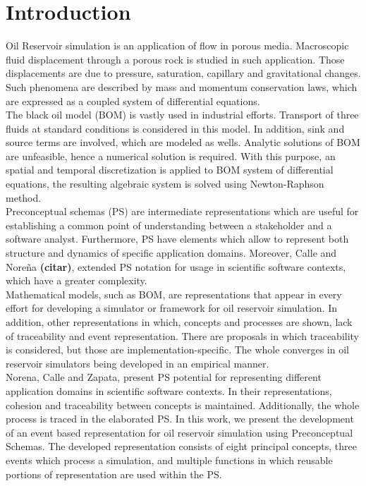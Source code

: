 \documentclass[review]{elsarticle}
\begin{document}
\linenumbers

\section{Introduction}
Oil Reservoir simulation is an application of flow in porous media. Macroscopic fluid displacement through a porous rock is studied in such application. Those displacements are due to pressure, saturation, capillary and gravitational changes. Such phenomena are described by mass and momentum conservation laws, which are expressed as a coupled system of differential equations.\\

The black oil model (BOM) is vastly used in industrial efforts. Transport of three fluids at standard conditions is considered in this model. In addition, sink and source terms are involved, which are modeled as wells. Analytic solutions of BOM are unfeasible, hence a numerical solution is required. With this purpose, an spatial and temporal discretization is applied to BOM system of differential equations, the resulting algebraic system is solved using Newton-Raphson method.\\

Preconceptual schemas (PS) are intermediate representations which are useful for establishing a common point of understanding between a stakeholder and a software analyst. Furthermore, PS have elements which allow to represent both structure and dynamics of specific application domains. Moreover, Calle and Nore\~na \textbf{{(citar)}}, extended PS notation for usage in scientific software contexts, which have a greater complexity.\\

Mathematical models, such as BOM, are representations that appear in every effort for developing a simulator or framework for oil reservoir simulation. In addition, other representations in which, concepts and processes are shown, lack of traceability and event representation. There are proposals in which traceability is considered, but those are implementation-specific. The whole converges in oil reservoir simulators being developed in an empirical manner.\\

Norena, Calle and Zapata, present PS potential for representing different application domains in scientific software contexts. In their representations, cohesion and traceability between concepts is maintained. Additionally, the whole process is traced in the elaborated PS. In this work, we present the development of an event based representation for oil reservoir simulation using Preconceptual Schemas. The developed representation consists of eight principal concepts, three events which process a simulation, and multiple functions in which reusable portions of representation are used within the PS.
\end{document}
